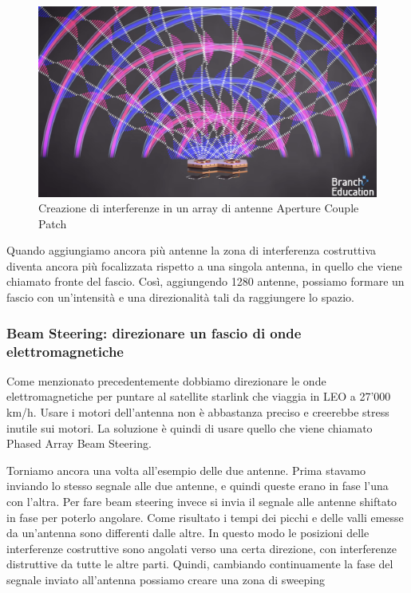 \begin{figure}[htbp]
  \centering
  \includegraphics[width=0.8\linewidth]{./res/img/antenna_interference.png}
  \caption{Creazione di interferenze in un array di antenne Aperture Couple Patch \cite{branch_education_how_2022}}
  \label{fig:aperture-couple-patch-antenna-interference}
\end{figure}

Quando aggiungiamo ancora più antenne la zona di interferenza costruttiva diventa ancora più focalizzata rispetto a una singola antenna, in quello che viene chiamato fronte del fascio.
Così, aggiungendo 1280 antenne, possiamo formare un fascio con un'intensità e una direzionalità tali da raggiungere lo spazio.


\subsubsection{Beam Steering: direzionare un fascio di onde elettromagnetiche}
Come menzionato precedentemente dobbiamo direzionare le onde elettromagnetiche per puntare al satellite starlink che viaggia in \ac{LEO} a 27'000 km/h.
Usare i motori dell'antenna non è abbastanza preciso e creerebbe stress inutile sui motori.
La soluzione è quindi di usare quello che viene chiamato Phased Array Beam Steering.

Torniamo ancora una volta all'esempio delle due antenne.
Prima stavamo inviando lo stesso segnale alle due antenne, e quindi queste erano in fase l'una con l'altra.
Per fare beam steering invece si invia il segnale alle antenne shiftato in fase per poterlo angolare.
Come risultato i tempi dei picchi e delle valli emesse da un'antenna sono differenti dalle altre.
In questo modo le posizioni delle interferenze costruttive sono angolati verso una certa direzione, con interferenze distruttive da tutte le altre parti.
Quindi, cambiando continuamente la fase del segnale inviato all'antenna possiamo creare una zona di sweeping %

